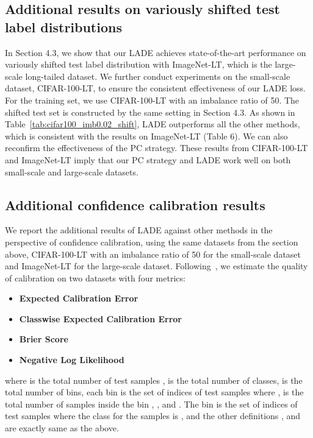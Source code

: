 \documentclass[final]{cvpr}
\begin{document}
\subsection{Additional results on variously shifted test label distributions}
In Section 4.3, we show that our LADE achieves state-of-the-art performance on variously shifted test label distribution with ImageNet-LT, which is the large-scale long-tailed dataset.
We further conduct experiments on the small-scale dataset, CIFAR-100-LT, to ensure the consistent effectiveness of our LADE loss.
For the training set, we use CIFAR-100-LT with an imbalance ratio of 50.
The shifted test set is constructed by the same setting in Section 4.3.
As shown in Table~\ref{tab:cifar100_imb0.02_shift}, LADE outperforms all the other methods, which is consistent with the results on ImageNet-LT (Table 6).
We can also reconfirm the effectiveness of the PC strategy.
These results from CIFAR-100-LT and ImageNet-LT imply that our PC strategy and LADE work well on both small-scale and large-scale datasets.

\subsection{Additional confidence calibration results}
We report the additional results of LADE against other methods in the perspective of confidence calibration, using the same datasets from the section above, CIFAR-100-LT with an imbalance ratio of 50 for the small-scale dataset and ImageNet-LT for the large-scale dataset.
Following~\cite{ovadia2019can, kull2019beyond}, we estimate the quality of calibration on two datasets with four metrics:
\begin{itemize}[leftmargin=*]
\item \textbf{Expected Calibration Error}

\item \textbf{Classwise Expected Calibration Error}


\item \textbf{Brier Score}

\item \textbf{Negative Log Likelihood}

\end{itemize}
where  is the total number of test samples ,
 is the total number of classes,
 is the total number of bins,
each bin  is the set of indices of test samples where ,
 is the total number of samples inside the bin ,
,
and .
The bin  is the set of indices of test samples where the class for the samples is , and the other definitions ,  and  are exactly same as the above.
\end{document}
